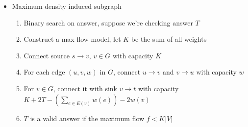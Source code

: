 \begin{itemize}
    \itemsep-0.3em
    \item Maximum density induced subgraph
    \vspace{-1em}
    \begin{enumerate}
        \itemsep-0.3em
        \item Binary search on answer, suppose we're checking answer $T$
        \item Construct a max flow model, let $K$ be the sum of all weights
        \item Connect source $s \rightarrow v$, $v \in G$ with capacity $K$
        \item For each edge $(u, v, w)$ in $G$, connect $u \rightarrow v$ and $v \rightarrow u$ with capacity $w$
        \item For $v \in G$, connect it with sink $v \rightarrow t$ with capacity $K + 2T - (\sum_{e \in E(v)}{w(e)}) - 2w(v)$
        \item $T$ is a valid answer if the maximum flow $f < K \lvert V \rvert$
    \end{enumerate}
\end{itemize}
